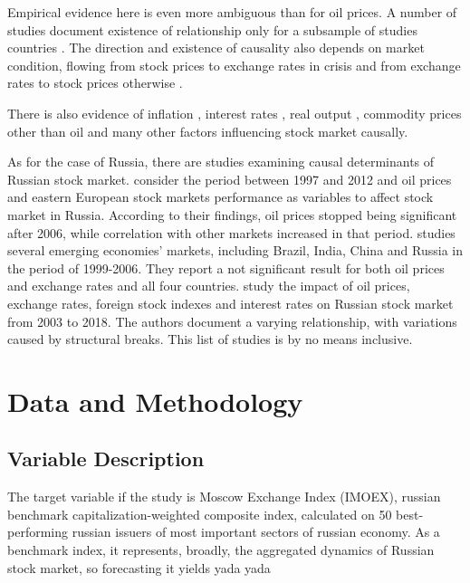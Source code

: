 \documentclass[stu]{apa7}
\begin{document}
Empirical evidence here is even more ambiguous than for oil prices.
A number of studies document existence of relationship only for a subsample of studies countries \citep[][among many others]{inci_dynamic_2014, chen_untangling_2012}.
The direction and existence of causality also depends on market condition, flowing from  stock prices to exchange rates in crisis and from exchange rates to stock prices otherwise \citep{kollias_nexus_2012, tsagkanos_long-run_2013}.

There is also evidence of inflation \citep{anari_stock_2001, eldomiaty_associations_2019}, interest rates \citep{hashemzadeh_stock_1988}, real output \citep{durai_stock_2009, zhao_stock_1999}, commodity prices other than oil \citep{raza_asymmetric_2016, sadorsky_modeling_2014} and many other factors influencing stock market causally.

As for the case of Russia, there are studies examining causal determinants of Russian stock market. \citet{kordonis_stock_2016} consider the period between 1997 and 2012 and oil prices and eastern European stock markets performance as variables to affect stock market in Russia. According to their findings, oil prices stopped being significant after 2006, while correlation with other markets increased in that period. \citet{robert_d_gay_effect_2008} studies several emerging economies' markets, including Brazil, India, China and Russia in the period of 1999-2006. They report a not significant result for both oil prices and exchange rates and all four countries. \citet{lozinskaia_fundamental_2019} study the impact of oil prices, exchange rates, foreign stock indexes and interest rates on Russian stock market from 2003 to 2018. The authors document a varying relationship, with variations caused by structural breaks. This list of studies is by no means inclusive.

\section{Data and Methodology}

\subsection{Variable Description}

The target variable if the study is Moscow Exchange Index (IMOEX), russian benchmark capitalization-weighted composite index, calculated on 50 best-performing russian issuers of most important sectors of russian economy. As a benchmark index, it represents, broadly, the aggregated dynamics of Russian stock market, so forecasting it yields yada yada
\end{document}
